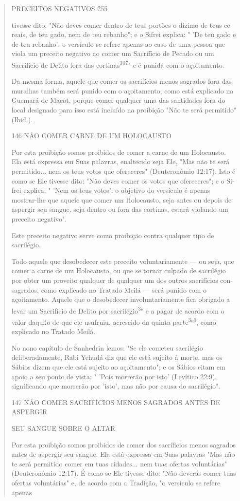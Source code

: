 \begin{quote}
PRECEITOS NEGATIVOS 255

tivesse dito: "Não deves comer dentro de teus portões o dízimo de teus
ce­reais, de teu gado, nem de teu rebanho"; e o Sifrei explica: " 'De
teu gado e de teu rebanho': o versículo se refere apenas ao caso de uma
pessoa que viola um preceito negativo ao comer um Sacrifício de Pecado
ou um Sacrifício de Delito fora das cortinas\textsuperscript{307}" e é
punida com o açoitamento.

Da mesma forma, aquele que comer os sacrifícios menos sagrados fora das
muralhas também será punido com o açoitamento, como está explica­do na
Guemará de Macot, porque comer qualquer uma das santidades fora do local
designado para isso está incluído na proibição "Não te será permitido"
(Ibid.).

146 NÃO COMER CARNE DE UM HOLOCAUSTO

Por esta proibição somos proibidos de comer a carne de um Holo­causto.
Ela está expressa em Suas palavras, enaltecido seja Ele, "Mas não te
será permitido... nem os teus votos que ofereceres" (Deuteronômio
12:17). Isto é como se Ele tivesse dito: "Não deves comer os votos que
ofereceres"; e o Si-frei explica: " 'Nem os teus votos': o objetivo do
versículo é apenas mostrar-lhe que aquele que comer um Holocausto, seja
antes ou depois de aspergir seu sangue, seja dentro ou fora das
cortinas, estará violando um preceito negativo".

Este preceito negativo serve como proibição contra qualquer tipo de
sacrilégio.

Todo aquele que desobedecer este preceito voluntariamente --- ou seja,
que comer a carne de um Holocausto, ou que se tornar culpado de
sacrilé­gio por obter um proveito qualquer de qualquer um dos outros
sacrifícios con­sagrados, como explicado no Tratado Meilá --- será
punido com o açoitamento. Aquele que o desobedecer involuntariamente
fica obrigado a levar um Sacrifí­cio de Delito por
sacrilégio\textsuperscript{3}" e a pagar de acordo com o valor daquilo
de que ele usufruiu, acrescido da quinta
parte\textsuperscript{3}°\textsuperscript{9}, como explicado no Tratado
Meilá.

No nono capítulo de Sanhedrin lemos: "Se ele cometeu sacrilégio
deliberadamente, Rabi Yehudá diz que ele está sujeito à morte, mas os
Sábios dizem que ele está sujeito ao açoitamento"; e os Sábios citam em
apoio a seu ponto de vista: " 'Pois morrerão por isto' (Levítico 22:9),
significando que mor­rerão por 'isto', mas não por causa do sacrilégio".

147 NÃO COMER SACRIFÍCIOS MENOS SAGRADOS ANTES DE ASPERGIR

SEU SANGUE SOBRE O ALTAR

Por esta proibição somos proibidos de comer dos sacríficios menos
sagrados antes de aspergir seu sangue. Ela está expressa em Suas
palavras "Mas não te será permitido comer em tuas cidades... nem tuas
ofertas voluntárias" (Deuteronômio 12:17). É como se Ele tivesse dito:
"Não deverás comer tuas ofertas voluntárias" e, de acordo com a
Tradição, "o versículo se refere apenas
\end{quote}

